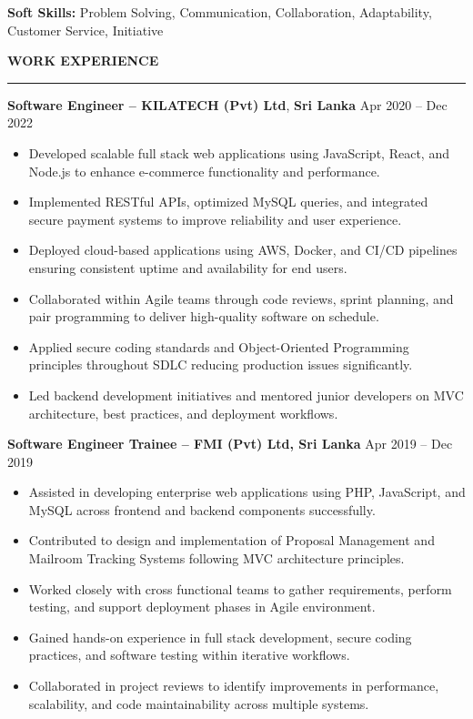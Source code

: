 \documentclass[10pt,letterpaper]{article}
\begin{document}
\textbf{Soft Skills:} Problem Solving, Communication, Collaboration, Adaptability, Customer Service, Initiative

\vspace{8pt}

\textbf{WORK EXPERIENCE}\\[-8pt]
\noindent\rule{\textwidth}{1pt}

\vspace{-2pt}

\textbf{Software Engineer -- KILATECH (Pvt) Ltd}, \textbf{Sri Lanka} \hfill Apr 2020 -- Dec 2022

\vspace{-1pt}

\begin{itemize}
\item Developed scalable full stack web applications using JavaScript, React, and Node.js to enhance e-commerce functionality and performance.
\item Implemented RESTful APIs, optimized MySQL queries, and integrated secure payment systems to improve reliability and user experience.
\item Deployed cloud-based applications using AWS, Docker, and CI/CD pipelines ensuring consistent uptime and availability for end users.
\item Collaborated within Agile teams through code reviews, sprint planning, and pair programming to deliver high-quality software on schedule.
\item Applied secure coding standards and Object-Oriented Programming principles throughout SDLC reducing production issues significantly.
\item Led backend development initiatives and mentored junior developers on MVC architecture, best practices, and deployment workflows.
\end{itemize}

\textbf{Software Engineer Trainee -- FMI (Pvt) Ltd, Sri Lanka} \hfill Apr 2019 -- Dec 2019

\vspace{-1pt}

\begin{itemize}
\item Assisted in developing enterprise web applications using PHP, JavaScript, and MySQL across frontend and backend components successfully.
\item Contributed to design and implementation of Proposal Management and Mailroom Tracking Systems following MVC architecture principles.
\item Worked closely with cross functional teams to gather requirements, perform testing, and support deployment phases in Agile environment.
\item Gained hands-on experience in full stack development, secure coding practices, and software testing within iterative workflows.
\item Collaborated in project reviews to identify improvements in performance, scalability, and code maintainability across multiple systems.
\end{itemize}
\end{document}
